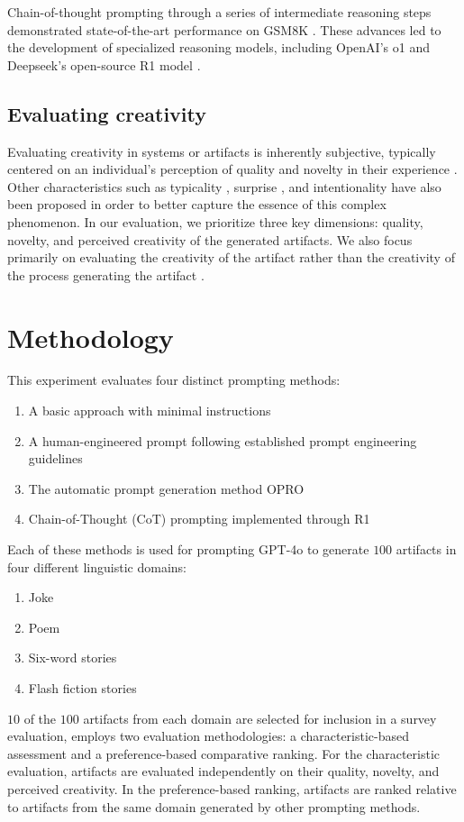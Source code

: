 \documentclass[phd,electronic,oneside,twosidetoc,letterpaper,chaptercenter,parttop,lof]{byumsphd}
\begin{document}
Chain-of-thought prompting through a series of intermediate reasoning steps demonstrated state-of-the-art performance on GSM8K \cite{wei2022cot}. These advances led to the development of specialized reasoning models, including OpenAI's o1 \cite{o1} and Deepseek's open-source R1 model \cite{deepseek2025r1}.

\subsection{Evaluating creativity}

Evaluating creativity in systems or artifacts is inherently subjective, typically centered on an individual's perception of quality and novelty in their experience \cite{boden92,wiggins2006creativity}. Other characteristics such as typicality \cite{ritchie07}, surprise \cite{grace2014expect}, and intentionality \cite{ventura2017howto} have also been proposed in order to better capture the essence of this complex phenomenon. In our evaluation, we prioritize three key dimensions: quality, novelty, and perceived creativity of the generated artifacts. We also focus primarily on evaluating the creativity of the artifact rather than the creativity of the process generating the artifact \cite{ritchie07,colton2008tripod}.

\section{Methodology}


This experiment evaluates four distinct prompting methods: 
\begin{enumerate}
  \setlength{\itemsep}{1pt}
  \setlength{\parskip}{0pt}
  \setlength{\parsep}{0pt}
    \item A basic approach with minimal instructions
    \item A human-engineered prompt following established prompt engineering guidelines
    \item The automatic prompt generation method OPRO
    \item Chain-of-Thought (CoT) prompting implemented through R1
\end{enumerate}
Each of these methods is used for prompting GPT-4o to generate $100$ artifacts in four different linguistic domains:
\begin{enumerate}
  \setlength{\itemsep}{1pt}
  \setlength{\parskip}{0pt}
  \setlength{\parsep}{0pt}
    \item Joke
    \item Poem
    \item Six-word stories
    \item Flash fiction stories
\end{enumerate}
$10$ of the $100$ artifacts from each domain are selected for inclusion in a survey evaluation, employs two evaluation methodologies: a characteristic-based assessment and a preference-based comparative ranking. For the characteristic evaluation, artifacts are evaluated independently on their quality, novelty, and perceived creativity. In the preference-based ranking, artifacts are ranked relative to artifacts from the same domain generated by other prompting methods. 
\end{document}
